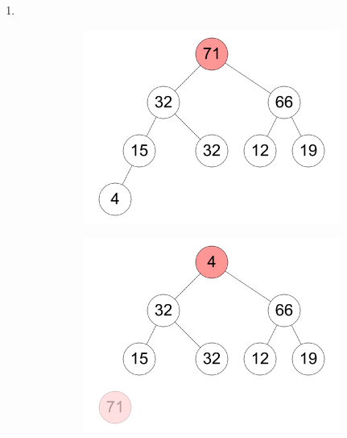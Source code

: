 \documentclass[11pt,a4paper]{article}
\begin{document}
\begin{loesung}
\begin{enumerate}
        \item \ \\
        \begin{figure}[h!]
            \centering
            \begin{subfigure}[b]{0.23\textwidth}
                \centering
                \includegraphics[width=\textwidth]{img/b1}
            \end{subfigure}
            \begin{subfigure}[b]{0.23\textwidth}
                \centering
                \includegraphics[width=\textwidth]{img/b2}
            \end{subfigure}
            \begin{subfigure}[b]{0.23\textwidth}

\end{subfigure}
\end{figure}
\end{enumerate}
\end{loesung}
\end{document}
